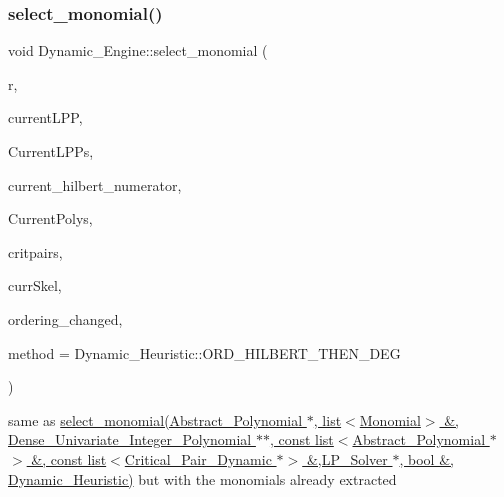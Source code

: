 \subsubsection{\texorpdfstring{select\+\_\+monomial()}{select\_monomial()}\hspace{0.1cm}{\footnotesize\ttfamily [2/2]}}
{\footnotesize\ttfamily void Dynamic\+\_\+\+Engine\+::select\+\_\+monomial (\begin{DoxyParamCaption}\item[{const set$<$ \hyperlink{group__polygroup_class_monomial}{Monomial} $>$ \&}]{r,  }\item[{const \hyperlink{group__polygroup_class_monomial}{Monomial} \&}]{current\+L\+PP,  }\item[{list$<$ \hyperlink{group__polygroup_class_monomial}{Monomial} $>$ \&}]{Current\+L\+P\+Ps,  }\item[{\hyperlink{group__polygroup_class_dense___univariate___integer___polynomial}{Dense\+\_\+\+Univariate\+\_\+\+Integer\+\_\+\+Polynomial} $\ast$$\ast$}]{current\+\_\+hilbert\+\_\+numerator,  }\item[{const list$<$ \hyperlink{group__polygroup_class_abstract___polynomial}{Abstract\+\_\+\+Polynomial} $\ast$ $>$ \&}]{Current\+Polys,  }\item[{const list$<$ \hyperlink{group___g_b_computation_class_critical___pair___dynamic}{Critical\+\_\+\+Pair\+\_\+\+Dynamic} $\ast$ $>$ \&}]{critpairs,  }\item[{\hyperlink{group___c_l_s_solvers_class_l_p___solvers_1_1_l_p___solver}{L\+P\+\_\+\+Solver} $\ast$}]{curr\+Skel,  }\item[{bool \&}]{ordering\+\_\+changed,  }\item[{\hyperlink{group___g_b_computation_ga819b1fd40d9a40ff303df3b90647ecb0}{Dynamic\+\_\+\+Heuristic}}]{method = {\ttfamily Dynamic\+\_\+Heuristic\+:\+:ORD\+\_\+HILBERT\+\_\+THEN\+\_\+DEG} }\end{DoxyParamCaption})}



same as {\ttfamily \hyperlink{group___g_b_computation_gaa01d88c431b84deabf51ee116d7d2a0e}{select\+\_\+monomial(\+Abstract\+\_\+\+Polynomial $\ast$, list$<$\+Monomial$>$ \&, Dense\+\_\+\+Univariate\+\_\+\+Integer\+\_\+\+Polynomial $\ast$$\ast$, const list$<$\+Abstract\+\_\+\+Polynomial $\ast$$>$ \&, const list$<$\+Critical\+\_\+\+Pair\+\_\+\+Dynamic $\ast$$>$ \&,\+L\+P\+\_\+\+Solver $\ast$, bool \&, Dynamic\+\_\+\+Heuristic)}} but with the monomials already extracted 


